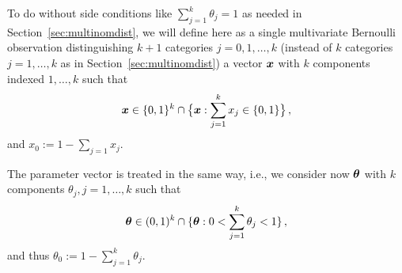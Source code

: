 To do without side conditions like $\sum_{j=1}^k \theta_j = 1$ as needed in Section~\ref{sec:multinomdist},
we will define here as a single multivariate Bernoulli observation distinguishing $k+1$ categories $j = 0,1,\ldots,k$
(instead of $k$ categories $j = 1,\ldots,k$ as in Section~\ref{sec:multinomdist})
a vector ${\bm x}$ with $k$ components indexed $1,\ldots,k$
such that
\begin{align*}
{\bm x} \in \{0,1\}^k \cap \big\{ {\bm x}: \sum_{j=1}^k x_j \in \{0,1\}  \big\}\,,
\end{align*}
and $x_0 := 1 - \sum_{j=1} x_j$.

The parameter vector is treated in the same way, i.e.,
we consider now $\boldsymbol{\theta}$ with $k$ components $\theta_j, j=1,\ldots,k$ such that
\begin{align*}
\boldsymbol{\theta} \in (0,1)^k \cap \{\boldsymbol{\theta}: 0 < \sum_{j=1}^k \theta_j < 1\}\,,
\end{align*}
and thus $\theta_0 := 1-\sum_{j=1}^k \theta_j$.

